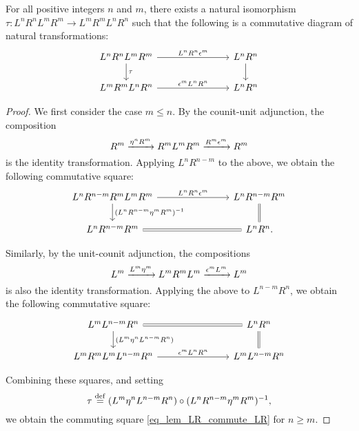 \begin{lem}\label{lem_LR_commute_LR}
For all positive integers $n$ and $m$, there exists a natural 
isomorphism $\tau : L^nR^nL^mR^m \to L^mR^mL^nR^n$ such that the 
following is a commutative diagram of natural transformations:
\begin{equation}\label{eq_lem_LR_commute_LR}
\begin{tikzcd}[column sep=75pt]
L^n R^n L^m R^m \arrow{r}{L^nR^n \epsilon^m} \arrow{d}{\tau} &
L^nR^n \arrow{d} \\
L^mR^m L^nR^n \arrow{r}{\epsilon^m L^nR^n} &
L^nR^n
\end{tikzcd}
\end{equation}
\end{lem}
\begin{proof}
We first consider the case $m \leq n$. By the counit-unit 
adjunction, the composition
\[
R^m \xrightarrow{\eta^n R^m}
R^m L^m R^m \xrightarrow{R^m \epsilon^m}
R^m
\]
is the identity transformation. Applying $L^nR^{n - m}$ to the 
above, we obtain the following commutative square:
\[
\begin{tikzcd}[column sep=75pt]
L^nR^{n - m}R^mL^mR^m \arrow{r}{L^nR^n\cuHI^m} 
   \arrow{d}{(L^nR^{n - m}\eta^m R^m)^{-1}} &
L^nR^{n - m}R^m \arrow[equals]{d} \\
L^nR^{n - m}R^m \arrow[equals]{r} &
L^nR^n.
\end{tikzcd}
\]

Similarly, by the unit-counit adjunction, the compositions
\[
L^m \xrightarrow{L^m \eta^m} L^m R^m L^m 
   \xrightarrow{\epsilon^m L^m} L^m
\]
is also the identity transformation. Applying the above to 
$L^{n - m}R^n$, we obtain the following commutative square:
\[
\begin{tikzcd}[column sep=75pt]
L^mL^{n - m}R^n \arrow[equals]{r} 
   \arrow{d}{(L^m\eta^n L^{n - m}R^n)} &
L^nR^n \arrow[equals]{d} \\
L^mR^mL^mL^{n - m}R^n \arrow{r}{\cuHI^m L^nR^n} &
L^mL^{n - m}R^n 
\end{tikzcd}
\]

Combining these squares, and setting 
\[
\tau \stackrel{\mathrm{def}}{=} (L^m\eta^n L^{n - m}R^n) \circ
(L^nR^{n - m}\eta^m R^m)^{-1},
\]
we obtain the commuting square \eqref{eq_lem_LR_commute_LR} for 
$n \geq m$. 


\end{proof}
